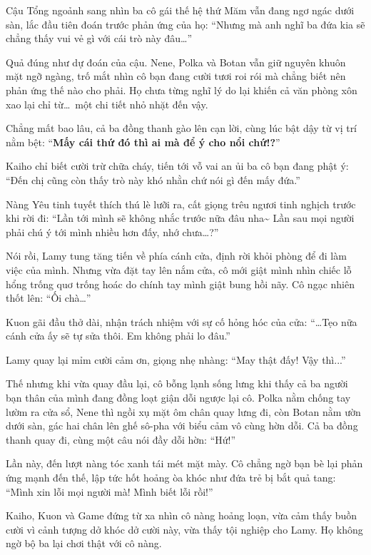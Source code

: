 \documentclass[../main.tex]{subfiles}
\begin{document}
Cậu Tổng ngoảnh sang nhìn ba cô gái thế hệ thứ Măm vẫn đang ngơ ngác dưới sàn, lắc đầu tiên đoán trước phản ứng của họ: ``Nhưng mà anh nghĩ ba đứa kia sẽ chẳng thấy vui vẻ gì với cái trò này đâu\dots''

Quả đúng như dự đoán của cậu. Nene, Polka và Botan vẫn giữ nguyên khuôn mặt ngỡ ngàng, trố mắt nhìn cô bạn đang cười tươi roi rói mà chẳng biết nên phản ứng thế nào cho phải. Họ chưa từng nghĩ lý do lại khiến cả văn phòng xôn xao lại chỉ từ\dots\ một chi tiết nhỏ nhặt đến vậy.

Chẳng mất bao lâu, cả ba đồng thanh gào lên cạn lời, cùng lúc bật dậy từ vị trí nằm bệt: ``\textbf{Mấy cái thứ đó thì ai mà để ý cho nổi chứ!?}''

Kaiho chỉ biết cười trừ chữa cháy, tiến tới vỗ vai an ủi ba cô bạn đang phật ý: ``Đến chị cũng còn thấy trò này khó nhằn chứ nói gì đến mấy đứa.''

Nàng Yêu tinh tuyết thích thú lè lưỡi ra, cất giọng trêu ngươi tinh nghịch trước khi rời đi: ``Lần tới mình sẽ không nhắc trước nữa đâu nha\~{} Lần sau mọi người phải chú ý tới mình nhiều hơn đấy, nhớ chưa\dots?''

Nói rồi, Lamy tung tăng tiến về phía cánh cửa, định rời khỏi phòng để đi làm việc của mình. Nhưng vừa đặt tay lên nắm cửa, cô mới giật mình nhìn chiếc lỗ hổng trống quơ trống hoác do chính tay mình giật bung hồi nãy. Cô ngạc nhiên thốt lên: ``Ối chà\dots ''

Kuon gãi đầu thở dài, nhận trách nhiệm với sự cố hỏng hóc của cửa: ``\dots Tẹo nữa cánh cửa ấy sẽ tự sửa thôi. Em không phải lo đâu.''

Lamy quay lại mỉm cười cảm ơn, giọng nhẹ nhàng: ``May thật đấy! Vậy thì...''

Thế nhưng khi vừa quay đầu lại, cô bỗng lạnh sống lưng khi thấy cả ba người bạn thân của mình đang đồng loạt giận dỗi ngược lại cô. Polka nằm chống tay lườm ra cửa sổ, Nene thì ngồi xụ mặt ôm chân quay lưng đi, còn Botan nằm ườn dưới sàn, gác hai chân lên ghế sô-pha với biểu cảm vô cùng hờn dỗi. Cả ba đồng thanh quay đi, cùng một câu nói đầy dỗi hờn: ``Hứ!''


Lần này, đến lượt nàng tóc xanh tái mét mặt mày. Cô chẳng ngờ bạn bè lại phản ứng mạnh đến thế, lập tức hốt hoảng òa khóc như đứa trẻ bị bắt quả tang: ``Mình xin lỗi mọi người mà! Mình biết lỗi rồi!''

Kaiho, Kuon và Game đứng từ xa nhìn cô nàng hoảng loạn, vừa cảm thấy buồn cười vì cảnh tượng dở khóc dở cười này, vừa thấy tội nghiệp cho Lamy. Họ không ngờ bộ ba lại chơi thật với cô nàng.
\end{document}
